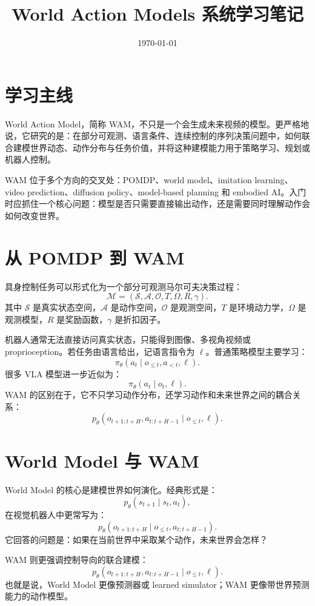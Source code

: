 \documentclass[11pt,a4paper]{ctexart}
\title{World Action Models 系统学习笔记}
\author{}
\date{\today}
\begin{document}
\maketitle
\tableofcontents
\newpage

\section{学习主线}

World Action Model，简称 WAM，不只是一个会生成未来视频的模型。更严格地说，它研究的是：在部分可观测、语言条件、连续控制的序列决策问题中，如何联合建模世界动态、动作分布与任务价值，并将这种建模能力用于策略学习、规划或机器人控制。

WAM 位于多个方向的交叉处：POMDP、world model、imitation learning、video prediction、diffusion policy、model-based planning 和 embodied AI。入门时应抓住一个核心问题：模型是否只需要直接输出动作，还是需要同时理解动作会如何改变世界。

\section{从 POMDP 到 WAM}

具身控制任务可以形式化为一个部分可观测马尔可夫决策过程：
\[
  \mathcal{M}=(\mathcal{S},\mathcal{A},\mathcal{O},T,\Omega,R,\gamma).
\]
其中 $\mathcal{S}$ 是真实状态空间，$\mathcal{A}$ 是动作空间，$\mathcal{O}$ 是观测空间，$T$ 是环境动力学，$\Omega$ 是观测模型，$R$ 是奖励函数，$\gamma$ 是折扣因子。

机器人通常无法直接访问真实状态，只能得到图像、多视角视频或 proprioception。若任务由语言给出，记语言指令为 $\ell$。普通策略模型主要学习：
\[
  \pi_\theta(a_t\mid o_{\le t},a_{<t},\ell).
\]
很多 VLA 模型进一步近似为：
\[
  \pi_\theta(a_t\mid o_t,\ell).
\]
WAM 的区别在于，它不只学习动作分布，还学习动作和未来世界之间的耦合关系：
\[
  p_\theta(o_{t+1:t+H},a_{t:t+H-1}\mid o_{\le t},\ell).
\]

\section{World Model 与 WAM}

World Model 的核心是建模世界如何演化。经典形式是：
\[
  p_\theta(s_{t+1}\mid s_t,a_t),
\]
在视觉机器人中更常写为：
\[
  p_\theta(o_{t+1:t+H}\mid o_{\le t},a_{t:t+H-1}).
\]
它回答的问题是：如果在当前世界中采取某个动作，未来世界会怎样？

WAM 则更强调控制导向的联合建模：
\[
  p_\theta(o_{t+1:t+H},a_{t:t+H-1}\mid o_{\le t},\ell).
\]
也就是说，World Model 更像预测器或 learned simulator；WAM 更像带世界预测能力的动作模型。
\end{document}
